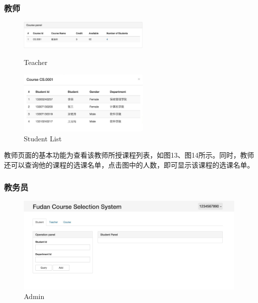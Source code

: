 \documentclass[a4paper, 11pt, nofonts, nocap, fancyhdr]{ctexart}
\begin{document}
\newpage
\subsubsection{教师}

	\begin{figure}[ht]
		\begin{minipage}{0.5\textwidth}
			\centering
			\includegraphics[width=2.5in]{teacher}
			\caption{Teacher}
		\end{minipage}%
		\begin{minipage}{0.5\textwidth}
			\centering
			\includegraphics[width=2.5in]{adteacou}
			\caption{Student List}
		\end{minipage}
			\vspace{0.8cm}

	\end{figure}

	教师页面的基本功能为查看该教师所授课程列表，如图13、图14所示。同时，教师还可以查询他的课程的选课名单，点击图中的人数，即可显示该课程的选课名单。

\newpage
\subsubsection{教务员}

	\begin{figure}[ht]
		\centering
		\includegraphics[width=6in]{adover}
		\caption{Admin}
	\end{figure}
\end{document}
